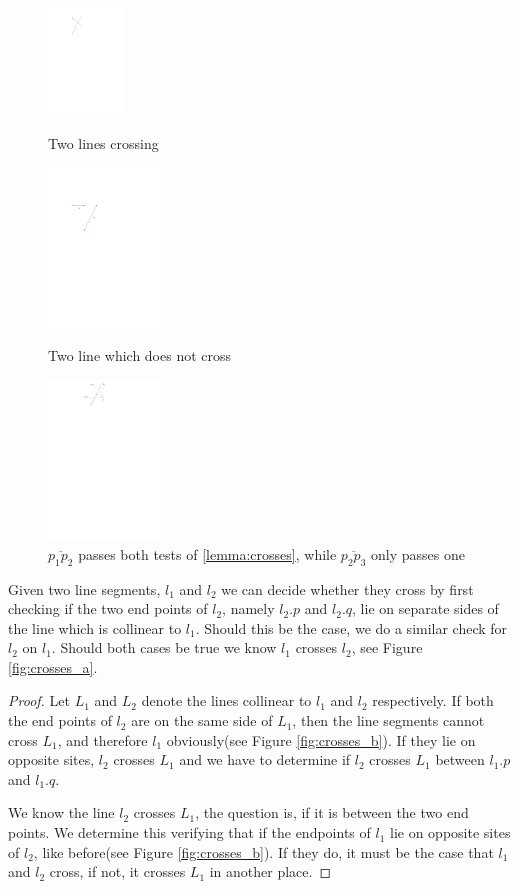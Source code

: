 \begin{figure}[H]
		\includegraphics[width=2cm]{figures/crosses.pdf}
		\caption{Two lines crossing}
		\label{fig:crosses_a}
	\endminipage\hfill
		\includegraphics[width=3cm]{figures/crosses1.pdf}
		\caption{Two line which does not cross}
		\label{fig:crosses_b}
	\endminipage\hfill
		\includegraphics[width=3cm]{figures/crosses2.pdf}
		\caption{$\overline{p_1p_2}$ passes both tests of \ref{lemma:crosses}, while $\overline{p_2p_3}$ only passes one}
		\label{fig:crosses_c}
		\endminipage\hfill
\end{figure}

\begin{Lemma} \label{lemma:crosses}
    Given two line segments, $l_1$ and $l_2$ we can decide whether they cross
    by first checking if the two end points of $l_2$, namely $l_2.p$ and $l_2.q$, 
    lie on separate sides of the line which is collinear to $l_1$. Should this be
    the case, we do a similar check for $l_2$ on $l_1$. Should both cases be true
    we know $l_1$ crosses $l_2$, see Figure \ref{fig:crosses_a}.
\end{Lemma}

\begin{proof}
Let $L_1$ and $L_2$ denote the lines collinear to $l_1$ and $l_2$ respectively.
	If both the end points of $l_2$ are on the same side of $L_1$, then the line
	segments cannot cross $L_1$, and therefore $l_1$ obviously(see Figure
	\ref{fig:crosses_b}). If they lie on opposite sites, $l_2$ crosses $L_1$ and
	we have to determine if $l_2$ crosses $L_1$ between $l_1.p$ and $l_1.q$. 

We know the line $l_2$ crosses $L_1$, the question is, if it is between the two
	end points. We determine this verifying that if the endpoints of $l_1$
	lie on opposite sites of $l_2$, like before(see Figure \ref{fig:crosses_b}).
	If they do, it must be the case that $l_1$ and $l_2$ cross, if not, it
	crosses $L_1$ in another place.
\end{proof}

